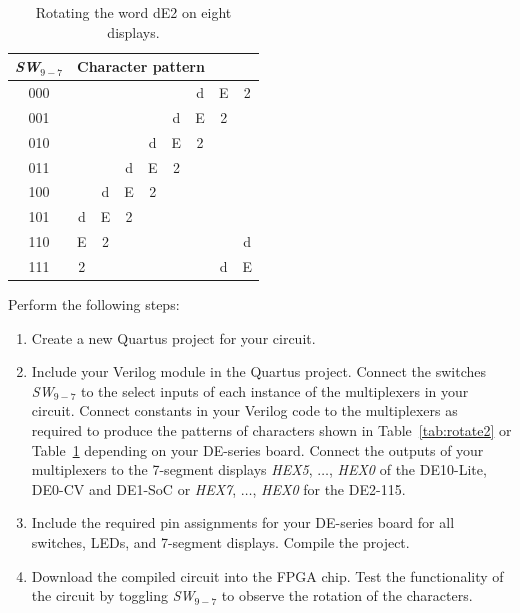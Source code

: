 \documentclass[epsfig,10pt,fullpage]{article}
\newcommand{\CommonDocsPath}{../../../common/docs}
\begin{document}
\begin{table}[ht]
\begin{minipage}[t]{12.5 cm}
\begin{center}
\begin{tabular}{c|cccccccc}
{\it SW}$_{9-7}$ & \multicolumn{6}{c}{Character pattern} \\
\hline
{\rule[0mm]{0mm}{5mm}000 } & & & & & & d & E & 2 \\ 
001 & & & & & d & E & 2 & \\
010 & & & & d & E & 2 & & \\
011 & & & d & E & 2 & & & \\
100 & & d & E & 2 & & & & \\
101 & d & E & 2 & & & & &  \\
110 & E & 2 & & & & & & d \\
111 & 2 & & & & & & d & E \\
\end{tabular}
\end{center}
\end{minipage}
\caption{Rotating the word dE2 on eight displays.}
\label{tab:rotate3}
\end{table}

Perform the following steps:
\begin{enumerate}
\item Create a new Quartus project for your circuit.
\item Include your Verilog module in the Quartus project. Connect the switches 
{\it SW}$_{9-7}$ to the select inputs of each instance of the 
multiplexers in your circuit. Connect constants in your Verilog code to the multiplexers 
as required to produce the patterns of characters shown in Table~\ref{tab:rotate2} or 
Table~\ref{tab:rotate3} depending on your DE-series board.
Connect the outputs of your multiplexers to the 7-segment displays {\it HEX5}, $\ldots$, 
{\it HEX0} of the DE10-Lite, DE0-CV and DE1-SoC or {\it HEX7}, $\ldots$, 
{\it HEX0} for the DE2-115.
\item Include the required pin assignments for your DE-series board for all switches, LEDs, 
and 7-segment displays. Compile the project.
\item Download the compiled circuit into the FPGA chip. Test the functionality of the 
circuit by toggling {\it SW}$_{9-7}$ to observe the rotation of the characters.
\end{enumerate}



\end{document}
